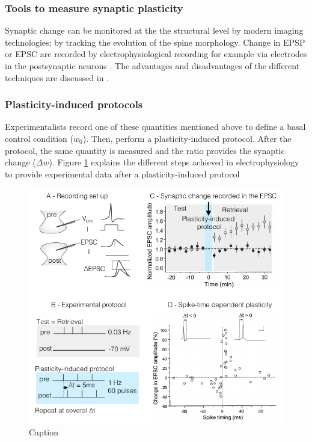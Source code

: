 \subsubsection{Tools to measure synaptic plasticity}
Synaptic change can be monitored at the the structural level by modern imaging technologies; by tracking the evolution of the spine morphology. Change in \acrshort{EPSP} or \acrshort{EPSC} are recorded by electrophysiological recording for example via electrodes in the postsynaptic neurons \citep{abraham_is_2019}. The advantages and disadvantages of the different techniques are discussed in  \citep{glasgow_approaches_2019}. 




\subsubsection{Plasticity-induced protocols}
Experimentalists record one of these quantities mentioned above to define a basal control condition ($w_0$). Then, perform a plasticity-induced protocol. After the protocol, the same quantity is measured and the ratio provides the synaptic change ($\Delta w$). Figure \ref{fig:SP_STDP} explains the different steps achieved in electrophysiology to provide experimental data after a plasticity-induced protocol \citep{bi_synaptic_1998} 


\begin{figure}[h!]
    \centering
    \includegraphics[scale=1]{latex/fig/Intro/SP_STDP.pdf}
    \caption{Caption \citep{bi_synaptic_1998}}
    \label{fig:SP_STDP}
\end{figure}

